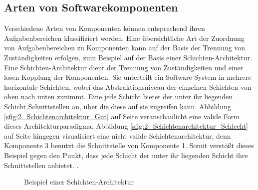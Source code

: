 \subsection{Arten von Softwarekomponenten}
\label{sec:2_Arten_Komponenten}

Verschiedene Arten von Komponenten können entsprechend ihren Aufgabenbereichen klassifiziert werden. Eine übersichtliche Art der Zuordnung von Aufgabenbereichen zu Komponenten kann auf der Basis der Trennung von Zuständigkeiten erfolgen, zum Beispiel auf der Basis einer Schichten-Architektur. Eine Schichten-Architektur dient der Trennung von Zuständigkeiten und einer losen Kopplung der Komponenten. Sie unterteilt ein Software-System in mehrere horizontale Schichten, wobei das Abstraktionsniveau der einzelnen Schichten von oben nach unten zunimmt. Eine jede Schicht bietet der unter ihr liegenden Schicht Schnittstellen an, über die diese auf sie zugreifen kann. Abbildung \ref{sfig:2_Schichtenarchitektur_Gut} auf Seite \pageref{fig:2_Schichtenarchitektur} veranschaulicht eine valide Form dieses Architekturparadigma. Abbildung \ref{sfig:2_Schichtenarchitektur_Schlecht} auf Seite \pageref{fig:2_Schichtenarchitektur} hingegen visualisiert eine nicht valide Schichtenarchitektur, denn Komponente 3 benutzt die Schnittstelle von Komponente 1. Somit verstößt dieses Beispiel gegen den Punkt, dass jede Schicht der unter ihr liegenden Schicht ihre Schnittstellen anbietet. \citereset \autocite[siehe][S. 17-25]{Andresen.2003}.

\begin{figure}[h]
  \centering
  \qquad
  \caption[
    Beispiel einer Schichten-Architektur, Urldate: 04.2014 \newline
    \small\texttt{\url{http://www.oop-uml.de/drei-schichten-architektur.php}}
  ]{
    Beispiel einer Schichten-Architektur
  }
  \label{fig:2_Schichtenarchitektur}
\end{figure}

